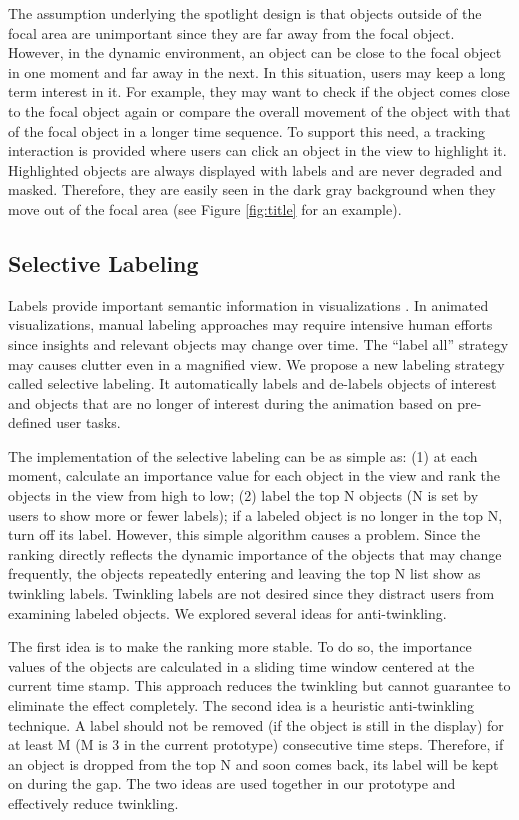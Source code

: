 \documentclass[review]{vgtc}                 %
\begin{document}
The assumption underlying the spotlight design is that objects outside of the focal area are unimportant since they are far away from the focal object. However, in the dynamic environment, an object can be close to the focal object in one moment and far away in the next. In this situation, users may keep a long term interest in it. For example, they may want to check if the object comes close to the focal object again or compare the overall movement of the object with that of the focal object in a longer time sequence. To support this need, a tracking interaction is provided where users can click an object in the view to highlight it. Highlighted objects are always displayed with labels and are never degraded and masked. Therefore, they are easily seen in the dark gray background when they move out of the focal area (see Figure \ref{fig:title} for an example).

\subsection{Selective Labeling}
Labels provide important semantic information in visualizations \cite{fekete1999excentric}. In animated visualizations, manual labeling approaches may require intensive human efforts since insights and relevant objects may change over time. The ``label all'' strategy may causes clutter even in a magnified view. We propose a new labeling strategy called selective labeling. It automatically labels and de-labels objects of interest and objects that are no longer of interest during the animation based on pre-defined user tasks.

The implementation of the selective labeling can be as simple as: (1) at each moment, calculate an importance value for each object in the view and rank the objects in the view from high to low; (2) label the top N objects (N is set by users to show more or fewer labels); if a labeled object is no longer in the top N, turn off its label. However, this simple algorithm causes a problem. Since the ranking directly reflects the dynamic importance of the objects that may change frequently, the objects repeatedly entering and leaving the top N list show as twinkling labels. Twinkling labels are not desired since they distract users from examining labeled objects. We explored several ideas for anti-twinkling.

The first idea is to make the ranking more stable. To do so, the importance values of the objects are calculated in a sliding time window centered at the current time stamp. This approach reduces the twinkling but cannot guarantee to eliminate the effect completely. The second idea is a heuristic anti-twinkling technique. A label should not be removed (if the object is still in the display) for at least M (M is 3 in the current prototype) consecutive time steps. Therefore, if an object is dropped from the top N and soon comes back, its label will be kept on during the gap. The two ideas are used together in our prototype and effectively reduce twinkling.
\end{document}
